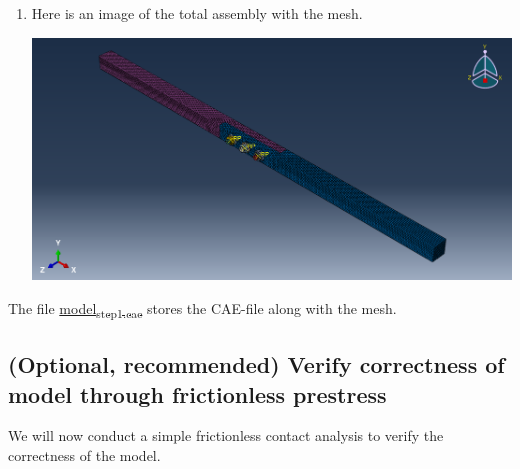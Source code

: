 \documentclass[11pt]{article}
\begin{document}
\begin{enumerate}
\begin{center}
\end{center}
\item Here is an image of the total assembly with the mesh.
\begin{center}
\includegraphics[width=.9\linewidth]{./figs/fullmesh.png}
\end{center}
\end{enumerate}

The file \href{https://github.com/Nidish96/Abaqus4Joints/blob/main/assets/assembly/model\_step1.cae}{model\textsubscript{step1.cae}} stores the CAE-file along with the mesh.
\subsection{(Optional, recommended) Verify correctness of model through frictionless prestress}
\label{sec:orgdd43433}
We will now conduct a simple frictionless contact analysis to verify the correctness of the model.
\end{document}
